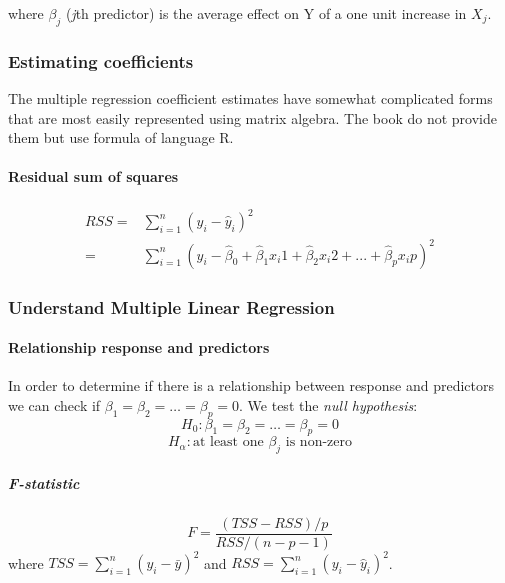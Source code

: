 \documentclass[a4paper]{article}
\begin{document}
				where $\beta_j$ (\textit{j}th predictor) is the average effect on Y of a one unit increase in $X_j$.
				
				\subsubsection{Estimating coefficients}
					The multiple regression coefficient estimates have somewhat complicated forms that are most easily represented using matrix algebra. The book do not provide them but use formula of language R.					
					
					\paragraph{Residual sum of squares}
					\begin{equation}
					\begin{split}
						RSS ={} & \sum_{i=1}^n (y_i - \hat{y}_i)^2 \\
							={} & \sum_{i=1}^n (y_i - \hat{\beta}_0 + \hat{\beta}_1 x_i1 + \hat{\beta}_2 x_i2 + ... + \hat{\beta}_p x_ip )^2
					\end{split}
					\end{equation}
					
				\subsubsection{Understand Multiple Linear Regression}
					
					\paragraph{Relationship response and predictors}
					In order to determine if there is a relationship between response and predictors we can check if $\beta_1=\beta_2=\dots=\beta_p = 0$. We test the \textit{null hypothesis}:
					\begin{equation}
						H_0 : \beta_1 = \beta_2 = \dots = \beta_p = 0
					\end{equation}
					\begin{equation}
						H_\alpha : \text{at least one } \beta_j \text{ is non-zero}
					\end{equation}
					
					\subparagraph{F-statistic}
					\begin{equation}
						F = \frac{(TSS - RSS)/p}{RSS / (n - p - 1)}
					\end{equation}
					where $TSS = \sum_{i=1}^n (y_i - \bar{y})^2$ and $RSS = \sum_{i=1}^n (y_i - \hat{y}_i)^2$.
					
\end{document}

